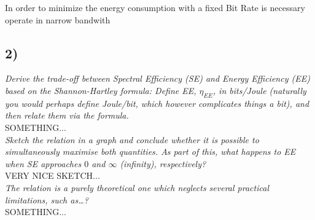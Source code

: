 In order to minimize the energy consumption with a fixed Bit Rate is necessary operate in narrow bandwith


\subsection{2)}
\textit{Derive the trade-off between Spectral Efficiency (SE) and Energy Efficiency (EE) based on the Shannon-Hartley formula: Define EE, $\eta_{EE}$, in bits/Joule (naturally you would perhaps define Joule/bit, which however complicates things a bit), and then relate them via the formula.}\\

SOMETHING...\\

\textit{Sketch the relation in a graph and conclude whether it is possible to simultaneously maximise both quantities. As part of this, what happens to EE when SE approaches $0$ and $\infty$ (infinity), respectively?}\\

VERY NICE SKETCH...\\

\textit{The relation is a purely theoretical one which neglects several practical limitations, such as…?}\\

SOMETHING...


